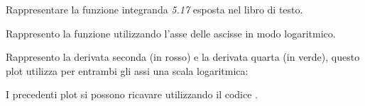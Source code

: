 \begin{exercise}
Rappresentare la funzione integranda \emph{5.17} esposta nel libro
di testo.
\end{exercise}
Rappresento la funzione utilizzando l'asse delle ascisse in modo logaritmico.
\begin{center}   

\end{center}
Rappresento la derivata seconda (in rosso) e la derivata quarta (in verde),
questo plot utilizza per entrambi gli assi una scala logaritmica:
\begin{center}   

\end{center} 
I precedenti plot si possono ricavare utilizzando il codice
.

